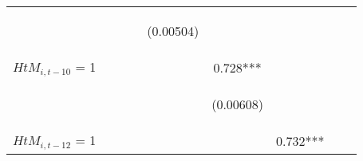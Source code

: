 \begin{center}
\begin{tabular}{lcccccccc}
\vspace{4pt} & \begin{footnotesize}\end{footnotesize} & \begin{footnotesize}\end{footnotesize} & \begin{footnotesize}\end{footnotesize} & \begin{footnotesize}(0.00504)\end{footnotesize} & \begin{footnotesize}\end{footnotesize} & \begin{footnotesize}\end{footnotesize} & \begin{footnotesize}\end{footnotesize} & \begin{footnotesize}\end{footnotesize} \\
$ {HtM}_{i, t-10} $ = 1 &  &  &  &  & 0.728*** &  &  &  \\
\vspace{4pt} & \begin{footnotesize}\end{footnotesize} & \begin{footnotesize}\end{footnotesize} & \begin{footnotesize}\end{footnotesize} & \begin{footnotesize}\end{footnotesize} & \begin{footnotesize}(0.00608)\end{footnotesize} & \begin{footnotesize}\end{footnotesize} & \begin{footnotesize}\end{footnotesize} & \begin{footnotesize}\end{footnotesize} \\
$ {HtM}_{i, t-12} $ = 1 &  &  &  &  &  & 0.732*** &  &  \\

\end{tabular}
\end{center}
